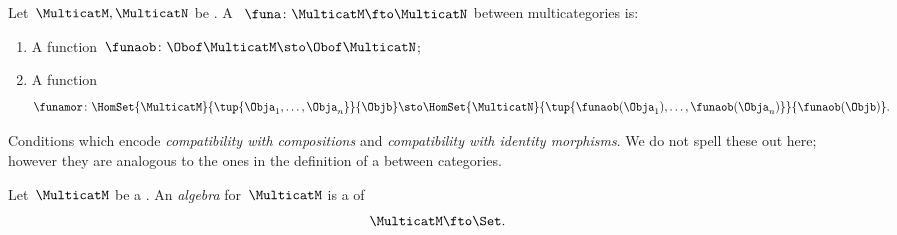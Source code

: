 \begin{ctdefinition}
    \label{def:functors-multicats}
    Let~$\MulticatM,\MulticatN$ be .
    A ~$\funa\colon \MulticatM \fto \MulticatN$ between multicategories is:
    
    \constit
    \begin{enumerate}
        \item A function~$\funaob\colon \Obof\MulticatM\sto \Obof\MulticatN$;
        \item A function
              \begin{equation}
                  \funamor\colon \HomSet{\MulticatM}{\tup{\Obja_1,\ldots,\Obja_n}}{\Objb}\sto \HomSet{\MulticatN}{\tup{\funaob(\Obja_1),\ldots, \funaob(\Obja_n)}}{\funaob(\Objb)}.
              \end{equation}
    \end{enumerate}
    
    \condit
    
    Conditions which encode \emph{compatibility with compositions}  and \emph{compatibility with identity morphisms}. We do not spell these out here; however they are analogous to the ones in the definition of a  between categories.
\end{ctdefinition}


\begin{ctdefinition}
    \label{def:algebra-of-multicat}
    Let~$\MulticatM$ be a .
    An \emph{algebra} for~$\MulticatM$ is a  of 
    $$\MulticatM \fto \Set.$$
\end{ctdefinition}


